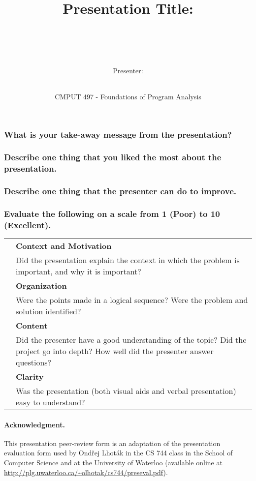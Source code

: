 \documentclass{article}
\title{Presentation Title: ~~~~~~~~~~~~~~~~~~~~~~~~~~~~~~~~~~~~~~~~~}
\author{Presenter: ~~~~~~~~~~~~~~~~~~~~~~~~~~~~~~~~~~~~~~~~~~~~~~~~~~~~~~~~~~~~~~~~~~~~~~~~}
\date{CMPUT 497 - Foundations of Program Analysis}
\begin{document}
\maketitle

\subsubsection*{What is your take-away message from the presentation?}
\vspace{2cm}



\subsubsection*{Describe one thing that you liked the most about the presentation.}
\vspace{2cm}



\subsubsection*{Describe one thing that the presenter can do to improve.}
\vspace{2cm}


\subsubsection*{Evaluate the following on a scale from 1 (Poor) to 10 (Excellent).}

\begin{table}[h]
\begin{tabularx}{\textwidth}{| p{1cm} | X |}
	\hline
	& \textbf{Context and Motivation} \\
	& Did the presentation explain the context in which the problem is important, and why it is important? \\ \hline
	& \textbf{Organization} \\ 
	& Were the points made in a logical sequence? Were the problem and solution identified? \\ \hline
	& \textbf{Content} \\ 
	& Did the presenter have a good understanding of the topic? Did the project go into depth? How well did the presenter answer questions? \\ \hline
	& \textbf{Clarity} \\ 
	& Was the presentation (both visual aids and verbal presentation) easy to understand? \\ \hline
\end{tabularx}
\end{table}

\paragraph{Acknowledgment.} This presentation peer-review form is an adaptation of the presentation evaluation form used by Ond\v{r}ej Lhot\'{a}k in the CS 744 class in the School of Computer Science and at the University of Waterloo (available online at \url{http://plg.uwaterloo.ca/~olhotak/cs744/preseval.pdf}).
\end{document}
